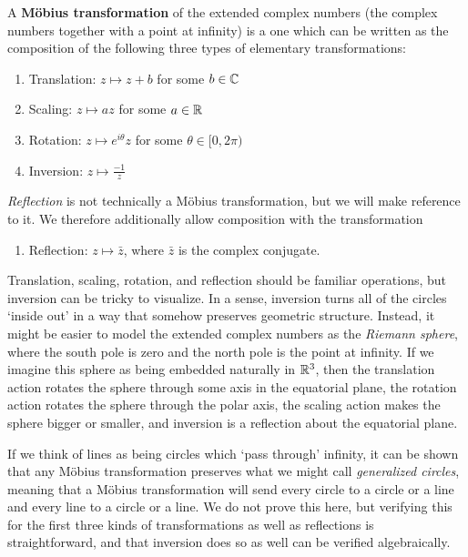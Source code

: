 \begin{definition}
A \textbf{M\"obius transformation} of the extended complex numbers (the complex numbers together with a point at infinity) is a one which can be written as the composition of the following three types of elementary transformations:


\begin{enumerate}
	\item[] Translation: $z\mapsto z+b$ for some $b\in \mathbb{C}$
	\item[] Scaling: $z\mapsto az$ for some $a\in \mathbb{R}$
	\item[] Rotation: $z\mapsto e^{i\theta}z$ for some $\theta\in [0,2\pi)$
	\item[] Inversion: $z \mapsto \tfrac{-1}{z}$
	
\end{enumerate}


\textit{Reflection} is not technically a M\"obius transformation, but we will make reference to it.  We therefore additionally allow composition with the transformation
\begin{enumerate}
	\item[] Reflection: $z\mapsto \bar{z}$, where $\bar{z}$ is the complex conjugate.
\end{enumerate}


\end{definition}


Translation, scaling, rotation, and reflection should be familiar operations, but inversion can be tricky to visualize.  In a sense, inversion turns all of the circles `inside out' in a way that somehow preserves geometric structure.  Instead, it might be easier to model the extended complex numbers as the \textit{Riemann sphere}, where the south pole is zero and the north pole is the point at infinity.  If we imagine this sphere as being embedded naturally in $\mathbb{R}^3$, then the translation action rotates the sphere through some axis in the equatorial plane, the rotation action rotates the sphere through the polar axis, the scaling action makes the sphere bigger or smaller, and inversion is a reflection about the equatorial plane. 


If we think of lines as being circles which `pass through' infinity, it can be shown that any M\"obius transformation preserves what we might call \textit{generalized circles}, meaning that a M\"obius transformation will send every circle to a circle or a line and every line to a circle or a line.  We do not prove this here, but verifying this for the first three kinds of transformations as well as reflections is straightforward, and that inversion does so as well can be verified algebraically. 

